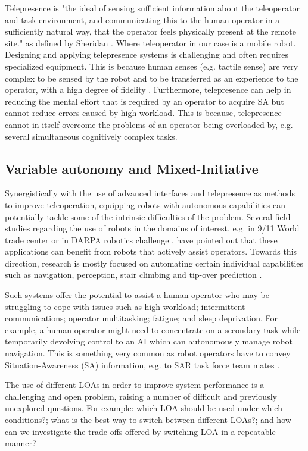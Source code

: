 \documentclass[a4paper,12pt,oneside,openright]{bhamthesis}
\begin{document}
Telepresence is "the ideal of sensing sufficient information about the teleoperator and task environment, and communicating this to the human operator in a sufficiently natural way, that the operator feels physically present at the remote site." as defined by Sheridan \citep{Sheridan1989}. Where teleoperator in our case is a mobile robot. Designing and applying telepresence systems is challenging and often requires specialized equipment. This is because human senses (e.g. tactile sense) are very complex to be sensed by the robot and to be transferred as an experience to the operator, with a high degree of fidelity \citep{Caldwell1996,Caldwell1994}. Furthermore, telepresence can help in reducing the mental effort that is required by an operator to acquire SA but cannot reduce errors caused by high workload. This is because, telepresence cannot in itself overcome the problems of an operator being overloaded by, e.g. several simultaneous cognitively complex tasks.

\subsection{Variable autonomy and Mixed-Initiative}
Synergistically with the use of advanced interfaces and telepresence as methods to improve teleoperation, equipping robots with autonomous capabilities can potentially tackle some of the intrinsic difficulties of the problem. Several field studies regarding the use of robots in the domains of interest, e.g. in 9/11 World trade center \citep{CasperMurphy911} or in DARPA robotics challenge \citep{Yanco2015DARPA}, have pointed out that these applications can benefit from robots that actively assist operators. Towards this direction, research is mostly focused on automating certain individual capabilities such as navigation, perception, stair climbing and tip-over prediction \citep{Liu2013}. 

Such systems offer the potential to assist a human operator who may be struggling to cope with issues such as high workload; intermittent communications; operator multitasking; fatigue; and sleep deprivation. For example, a human operator might need to concentrate on a secondary task while temporarily devolving control to an AI which can autonomously manage robot navigation. This is something very common as robot operators have to convey Situation-Awareness (SA) information, e.g. to SAR task force team mates \citep{Murphy2005a,Burke2004a}.

The use of different LOAs in order to improve system performance is a challenging and open problem, raising a number of difficult and previously unexplored questions. For example: which LOA should be used under which conditions?; what is the best way to switch between different LOAs?; and how can we investigate the trade-offs offered by switching LOA in a repeatable manner? 
\end{document}
